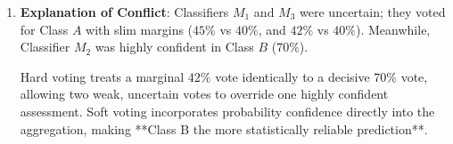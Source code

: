 \begin{enumerate}
\begin{enumerate}[label=(\alph*)]
        \item \textbf{Explanation of Conflict}:
        Classifiers $M_1$ and $M_3$ were uncertain; they voted for Class $A$ with slim margins ($45\%$ vs $40\%$, and $42\%$ vs $40\%$). Meanwhile, Classifier $M_2$ was highly confident in Class $B$ ($70\%$). 
        
        Hard voting treats a marginal $42\%$ vote identically to a decisive $70\%$ vote, allowing two weak, uncertain votes to override one highly confident assessment. Soft voting incorporates probability confidence directly into the aggregation, making **Class B the more statistically reliable prediction**.
    \end{enumerate}
\end{enumerate}
